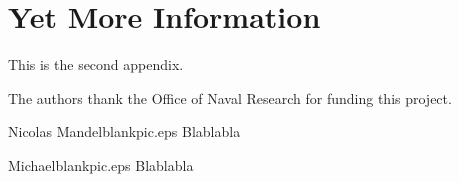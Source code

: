 \documentclass[twocolumn,letterpaper]{IEEEAerospaceCLS}  %
\begin{document}
\section{Yet More Information}    %
This is the second appendix.



\acknowledgments
The authors thank the Office of Naval Research for funding this project.







\thebiography
\begin{biographywithpic}{Nicolas Mandel}{blankpic.eps}
    Blablabla
\end{biographywithpic}

\begin{biographywithpic}{Michael}{blankpic.eps}
    Blablabla
\end{biographywithpic}
\end{document}
